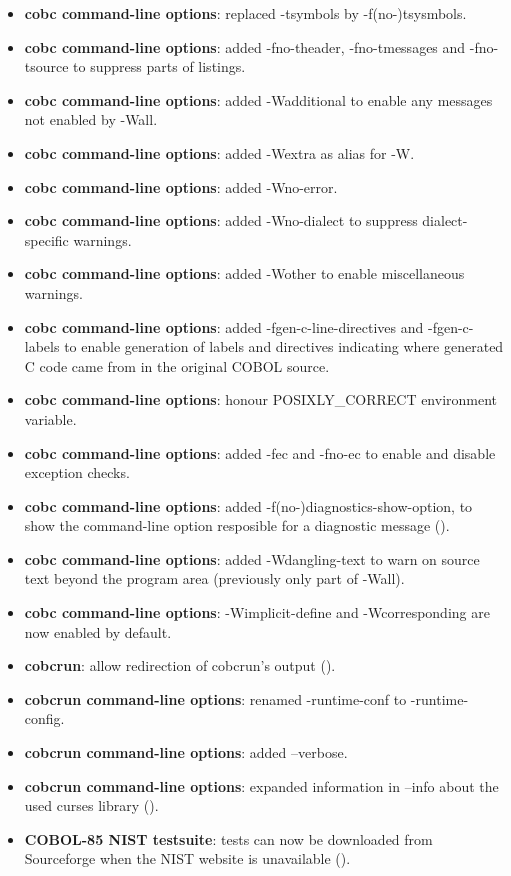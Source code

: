 \begin{itemize}
\item \textbf{cobc command-line options}: replaced -tsymbols by -f(no-)tsysmbols.
\item \textbf{cobc command-line options}: added -fno-theader, -fno-tmessages and -fno-tsource to suppress parts of listings.
\item \textbf{cobc command-line options}: added -Wadditional to enable any messages not enabled by -Wall.
\item \textbf{cobc command-line options}: added -Wextra as alias for -W.
\item \textbf{cobc command-line options}: added -Wno-error.
\item \textbf{cobc command-line options}: added -Wno-dialect to suppress dialect-specific warnings.
\item \textbf{cobc command-line options}: added -Wother to enable miscellaneous warnings.
\item \textbf{cobc command-line options}: added -fgen-c-line-directives and -fgen-c-labels to enable generation of labels and directives indicating where generated C code came from in the original COBOL source.
\item \textbf{cobc command-line options}: honour POSIXLY\_CORRECT environment variable.
\item \textbf{cobc command-line options}: added -fec and -fno-ec to enable and disable exception checks.
\item \textbf{cobc command-line options}: added -f(no-)diagnostics-show-option, to show the command-line option resposible for a diagnostic message ().
\item \textbf{cobc command-line options}: added -Wdangling-text to warn on source text beyond the program area (previously only part of -Wall).
\item \textbf{cobc command-line options}: -Wimplicit-define and -Wcorresponding are now enabled by default.
\item \textbf{cobcrun}: allow redirection of cobcrun's output ().
\item \textbf{cobcrun command-line options}: renamed -runtime-conf to -runtime-config.
\item \textbf{cobcrun command-line options}: added --verbose.
\item \textbf{cobcrun command-line options}: expanded information in --info about the used curses library ().
\item \textbf{COBOL-85 NIST testsuite}: tests can now be downloaded from Sourceforge when the NIST website is unavailable ().

\end{itemize}
